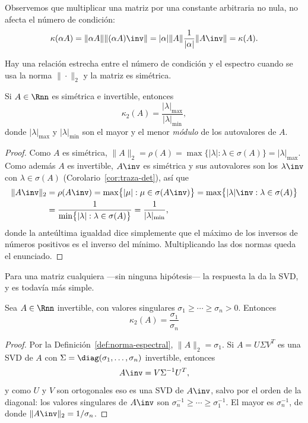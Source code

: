 \begin{remark} Observemos que multiplicar una matriz por una constante arbitraria no nula, no afecta el número de condición:
  \[
  \kappa(\alpha A) = \| \alpha A \| \| (\alpha A)\inv \|
  = |\alpha| \| A \| \frac{1}{|\alpha|} \| A\inv\| = \kappa(A).
  \]
\end{remark}

Hay una relación estrecha entre el número de condición y el espectro cuando se
usa la norma $\|\cdot\|_2$ y la matriz es simétrica.

\begin{lema}\label{L:condicion-simetrica}
  Si $A\in\Rnn$ es simétrica e invertible, entonces
  \[
  \kappa_2(A)=\frac{|\lambda|_{\max}}{|\lambda|_{\min}} ,
  \]
  donde $|\lambda|_{\max}$ y $|\lambda|_{\min}$ son el mayor y el menor
  \emph{módulo} de los autovalores de $A$.
\end{lema}

\begin{proof}
  Como $A$ es simétrica, $\|A\|_2=\rho(A)=\max\{|\lambda|:\lambda\in\sigma(A)\}
  =|\lambda|_{\max}$. Como además $A$ es invertible, $A\inv$ es simétrica y sus
  autovalores son los $\lambda\inv$ con $\lambda\in\sigma(A)$
  (Corolario~\ref{cor:traza-det}), así que
  \begin{align*}
  \|A\inv\|_2 &= \rho(A\inv)
  = \max\bigl\{|\mu| : \mu\in\sigma(A\inv)\bigr\}
  = \max\bigl\{|\lambda|\inv : \lambda\in\sigma(A)\bigr\}\\
  &= \frac{1}{\min\bigl\{|\lambda| : \lambda\in\sigma(A)\bigr\}}
  = \frac{1}{|\lambda|_{\min}} ,
  \end{align*}
  donde la anteúltima igualdad dice simplemente que el máximo de los inversos
  de números positivos es el inverso del mínimo. Multiplicando las dos normas
  queda el enunciado.
\end{proof}

Para una matriz cualquiera ---sin ninguna hipótesis--- la respuesta la da la
SVD, y es todavía más simple.

\begin{lema}\label{L:condicion-svd}
Sea $A\in\Rnn$ invertible, con valores singulares
$\sigma_1\ge\cdots\ge\sigma_n>0$. Entonces
\[
\boxed{\ \kappa_2(A)=\frac{\sigma_1}{\sigma_n}\ }
\]
\end{lema}

\begin{proof}
Por la Definición~\ref{def:norma-espectral}, $\|A\|_2=\sigma_1$. Si
$A=U\Sigma V^T$ es una SVD de $A$ con $\Sigma=\diag(\sigma_1,\dots,\sigma_n)$
invertible, entonces
\[
A\inv=V\Sigma^{-1}U^T ,
\]
y como $U$ y $V$ son ortogonales eso es una SVD de $A\inv$, salvo por el orden
de la diagonal: los valores singulares de $A\inv$ son
$\sigma_n^{-1}\ge\cdots\ge\sigma_1^{-1}$. El mayor es $\sigma_n^{-1}$, de
donde $\|A\inv\|_2=1/\sigma_n$.
\end{proof}

